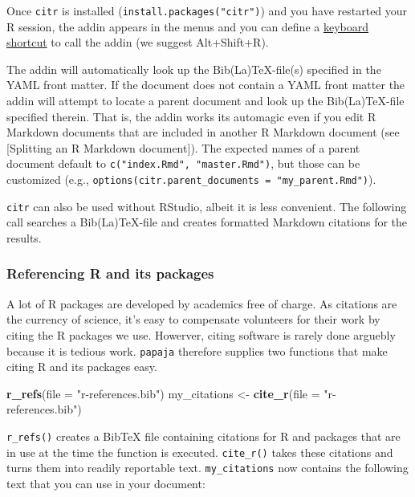 \documentclass[man,floatsintext]{apa6}
\newenvironment{Shaded}{\begin{snugshade}}{\end{snugshade}}
\newcommand{\KeywordTok}[1]{\textcolor[rgb]{0.13,0.29,0.53}{\textbf{#1}}}
\newcommand{\DataTypeTok}[1]{\textcolor[rgb]{0.13,0.29,0.53}{#1}}
\newcommand{\StringTok}[1]{\textcolor[rgb]{0.31,0.60,0.02}{#1}}
\newcommand{\NormalTok}[1]{#1}
\theoremstyle{definition}
\theoremstyle{definition}
\theoremstyle{definition}
\theoremstyle{remark}
\begin{document}
Once \texttt{citr} is installed (\texttt{install.packages("citr")}) and
you have restarted your R session, the addin appears in the menus and
you can define a
\href{https://rstudio.github.io/rstudioaddins/\#keyboard-shorcuts}{keyboard
shortcut} to call the addin (we suggest Alt+Shift+R).

The addin will automatically look up the Bib(La)TeX-file(s) specified in
the YAML front matter. If the document does not contain a YAML front
matter the addin will attempt to locate a parent document and look up
the Bib(La)TeX-file specified therein. That is, the addin works its
automagic even if you edit R Markdown documents that are included in
another R Markdown document (see {[}Splitting an R Markdown
document{]}). The expected names of a parent document default to
\texttt{c("index.Rmd",\ "master.Rmd")}, but those can be customized
(e.g., \texttt{options(citr.parent\_documents\ =\ "my\_parent.Rmd")}).

\texttt{citr} can also be used without RStudio, albeit it is less
convenient. The following call searches a Bib(La)TeX-file and creates
formatted Markdown citations for the results.

\subsubsection{Referencing R and its
packages}\label{referencing-r-and-its-packages}

A lot of R packages are developed by academics free of charge. As
citations are the currency of science, it's easy to compensate
volunteers for their work by citing the R packages we use. Howerver,
citing software is rarely done arguebly because it is tedious work.
\texttt{papaja} therefore supplies two functions that make citing R and
its packages easy.

\begin{Shaded}
\begin{Highlighting}[]
\KeywordTok{r_refs}\NormalTok{(}\DataTypeTok{file =} \StringTok{"r-references.bib"}\NormalTok{)}
\NormalTok{my_citations <-}\StringTok{ }\KeywordTok{cite_r}\NormalTok{(}\DataTypeTok{file =} \StringTok{"r-references.bib"}\NormalTok{)}
\end{Highlighting}
\end{Shaded}

\texttt{r\_refs()} creates a BibTeX file containing citations for R and
packages that are in use at the time the function is executed.
\texttt{cite\_r()} takes these citations and turns them into readily
reportable text. \texttt{my\_citations} now contains the following text
that you can use in your document:
\end{document}
